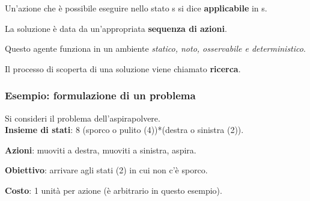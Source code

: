 Un'azione che è possibile eseguire nello stato s si dice \textbf{applicabile} in s.

La soluzione è data da un'appropriata \textbf{sequenza di azioni}.

Questo agente funziona in un ambiente \textit{statico, noto, osservabile e
deterministico}.

Il processo di scoperta di una soluzione viene chiamato \textbf{ricerca}.

\subsubsection{Esempio: formulazione di un problema}

Si consideri il problema dell'aspirapolvere. \\

\textbf{Insieme di stati}: 8 (sporco o pulito (4))*(destra o sinistra (2)).

\textbf{Azioni}: muoviti a destra, muoviti a sinistra, aspira.

\textbf{Obiettivo}: arrivare agli stati (2) in cui non c'è sporco.

\textbf{Costo}: 1 unità per azione (è arbitrario in questo esempio).






